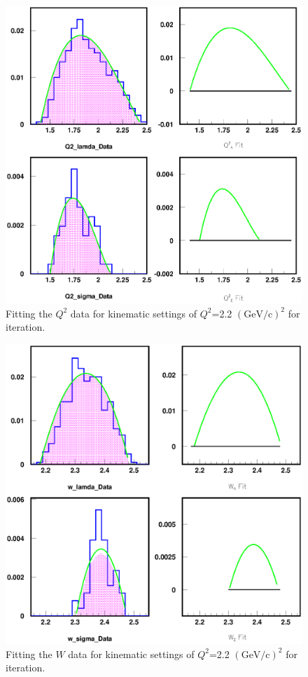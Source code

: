 \begin{figure}[!tbp]
  \centering
  \includegraphics[width=0.8\columnwidth]{fitfunction_kin2_1}
  \caption[Fitting $Q^2$ for iteration.]{\label{fig:fitfunction_kin2_1}Fitting the $Q^2$ data for kinematic settings of $Q^2$=2.2 $(\mathrm{GeV/c})^2$ for iteration.}
\end{figure}

\begin{figure}[!tbp]
  \centering
  \includegraphics[width=0.8\columnwidth]{fitfunction_kin2_2}
  \caption[Fitting $W$ for iteration.]{\label{fig:fitfunction_kin2_2}Fitting the $W$ data for kinematic settings of $Q^2$=2.2 $(\mathrm{GeV/c})^2$ for iteration.}
\end{figure}

